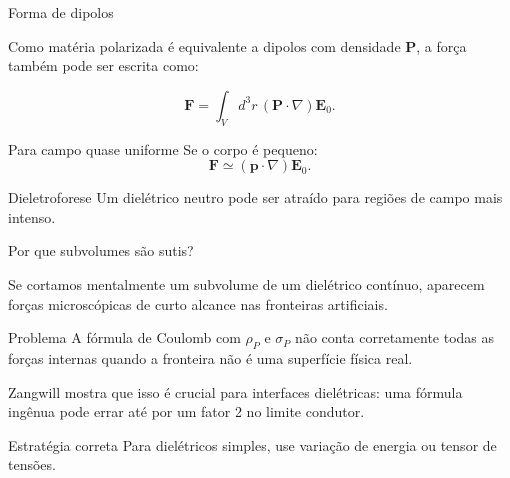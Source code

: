 \documentclass[aspectratio=169]{beamer}
\begin{document}
\begin{frame}{Forma de dipolos}

\small

Como matéria polarizada é equivalente a dipolos com densidade \(\mathbf P\), a
força também pode ser escrita como:

\begin{eqbox}
\begin{equation}
\mathbf F
=
\int_V d^3r\,
(\mathbf P\cdot\nabla)\mathbf E_0.
\tag{6.116}
\label{eq:forca-dipolos-dieletrico}
\end{equation}
\end{eqbox}

\begin{mybox}{Para campo quase uniforme}
Se o corpo é pequeno:
\[
\mathbf F\simeq(\mathbf p\cdot\nabla)\mathbf E_0.
\]
\end{mybox}

\begin{alertblock}{Dieletroforese}
Um dielétrico neutro pode ser atraído para regiões de campo mais intenso.
\end{alertblock}

\end{frame}

\begin{frame}{Por que subvolumes são sutis?}

\small

Se cortamos mentalmente um subvolume de um dielétrico contínuo, aparecem forças
microscópicas de curto alcance nas fronteiras artificiais.

\begin{mybox}{Problema}
A fórmula de Coulomb com \(\rho_P\) e \(\sigma_P\) não conta corretamente todas as
forças internas quando a fronteira não é uma superfície física real.
\end{mybox}

Zangwill mostra que isso é crucial para interfaces dielétricas: uma fórmula
ingênua pode errar até por um fator 2 no limite condutor.

\begin{alertblock}{Estratégia correta}
Para dielétricos simples, use variação de energia ou tensor de tensões.
\end{alertblock}

\end{frame}
\end{document}
